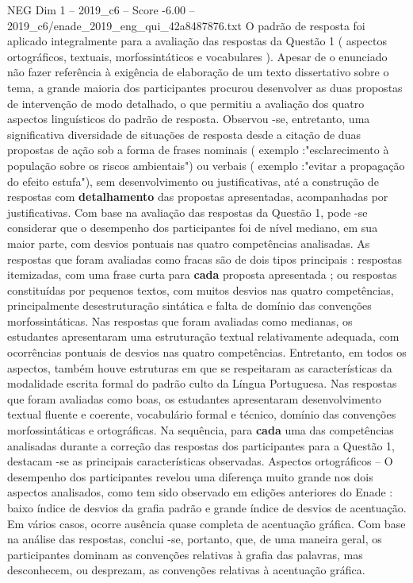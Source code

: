 \begin{textsample}{NEG Dim 1 – 2019\_c6 – Score -6.00 – 2019\_c6/enade\_2019\_eng\_qui\_42a8487876.txt}
O padrão de resposta foi aplicado integralmente para a avaliação das respostas da Questão 1 ( aspectos ortográficos, textuais, morfossintáticos e vocabulares ).
Apesar de o enunciado não fazer referência à exigência de elaboração de um texto dissertativo sobre o tema, a grande maioria dos participantes procurou desenvolver as duas propostas de intervenção de modo detalhado, o que permitiu a avaliação dos quatro aspectos linguísticos do padrão de resposta.
Observou -se, entretanto, uma significativa diversidade de situações de resposta desde a citação de duas propostas de ação sob a forma de frases nominais ( exemplo :"esclarecimento à população sobre os riscos ambientais") ou verbais ( exemplo :"evitar a propagação do efeito estufa"), sem desenvolvimento ou justificativas, até a construção de respostas com \textbf{detalhamento} das propostas apresentadas, acompanhadas por justificativas.
Com base na avaliação das respostas da Questão 1, pode -se considerar que o desempenho dos participantes foi de nível mediano, em sua maior parte, com desvios pontuais nas quatro competências analisadas.
As respostas que foram avaliadas como fracas são de dois tipos principais : respostas itemizadas, com uma frase curta para \textbf{cada} proposta apresentada ; ou respostas constituídas por pequenos textos, com muitos desvios nas quatro competências, principalmente desestruturação sintática e falta de domínio das convenções morfossintáticas.
Nas respostas que foram avaliadas como medianas, os estudantes apresentaram uma estruturação textual relativamente adequada, com ocorrências pontuais de desvios nas quatro competências.
Entretanto, em todos os aspectos, também houve estruturas em que se respeitaram as características da modalidade escrita formal do padrão culto da Língua Portuguesa.
Nas respostas que foram avaliadas como boas, os estudantes apresentaram desenvolvimento textual fluente e coerente, vocabulário formal e técnico, domínio das convenções morfossintáticas e ortográficas.
Na sequência, para \textbf{cada} uma das competências analisadas durante a correção das respostas dos participantes para a Questão 1, destacam -se as principais características observadas.
Aspectos ortográficos – O desempenho dos participantes revelou uma diferença muito grande nos dois aspectos analisados, como tem sido observado em edições anteriores do Enade : baixo índice de desvios da grafia padrão e grande índice de desvios de acentuação.
Em vários casos, ocorre ausência quase completa de acentuação gráfica.
Com base na análise das respostas, conclui -se, portanto, que, de uma maneira geral, os participantes dominam as convenções relativas à grafia das palavras, mas desconhecem, ou desprezam, as convenções relativas à acentuação gráfica.

\end{textsample}
